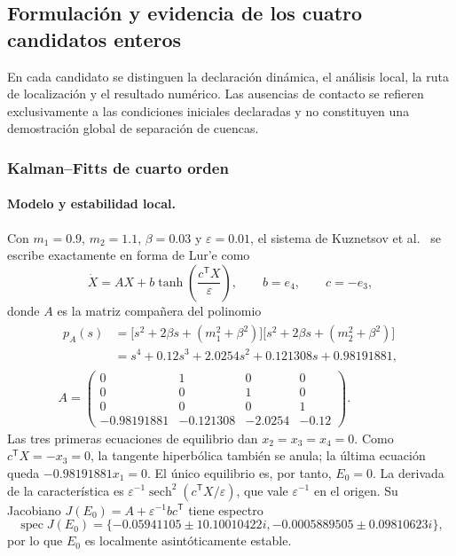 \subsection{Formulación y evidencia de los cuatro candidatos enteros}

En cada candidato se distinguen la declaración dinámica, el análisis local, la
ruta de localización y el resultado numérico. Las ausencias de contacto se
refieren exclusivamente a las condiciones iniciales declaradas y no constituyen
una demostración global de separación de cuencas.

\subsubsection{Kalman--Fitts de cuarto orden}

\paragraph{Modelo y estabilidad local.}
Con \(m_1=0.9\), \(m_2=1.1\), \(\beta=0.03\) y
\(\varepsilon=0.01\), el sistema de Kuznetsov et
al.~\cite{kalman2019} se escribe exactamente en forma de Lur'e como
\begin{equation}
 \dot X=AX+b\tanh\!\left(\frac{c^{\mathsf T}X}{\varepsilon}\right),
 \qquad b=e_4,\qquad c=-e_3,
 \label{ncbench:eq:kalman-lure}
\end{equation}
donde \(A\) es la matriz compañera del polinomio
\begin{equation}
 \begin{gathered}
  \begin{aligned}
   p_A(s)&=\bigl[s^2+2\beta s+(m_1^2+\beta^2)\bigr]
            \bigl[s^2+2\beta s+(m_2^2+\beta^2)\bigr]\\
   &=s^4+0.12s^3+2.0254s^2+0.121308s+0.98191881,
  \end{aligned}\\[0.6em]
  A=\begin{pmatrix}
   0&1&0&0\\0&0&1&0\\0&0&0&1\\
   -0.98191881&-0.121308&-2.0254&-0.12
  \end{pmatrix}.
 \end{gathered}
 \label{ncbench:eq:kalman-matrix}
\end{equation}
Las tres primeras ecuaciones de equilibrio dan \(x_2=x_3=x_4=0\).
Como \(c^{\mathsf T}X=-x_3=0\), la tangente hiperbólica también se anula;
la última ecuación queda \(-0.98191881x_1=0\). El único equilibrio es,
por tanto, \(E_0=0\). La derivada de la característica es
\(\varepsilon^{-1}\operatorname{sech}^2(c^{\mathsf T}X/\varepsilon)\),
que vale \(\varepsilon^{-1}\) en el origen. Su Jacobiano
\(J(E_0)=A+\varepsilon^{-1}bc^{\mathsf T}\) tiene espectro
\begin{equation}
 \operatorname{spec}J(E_0)=
 \{-0.05941105\pm10.10010422i,
   -0.0005889505\pm0.09810623i\},
 \label{ncbench:eq:kalman-spectrum}
\end{equation}
por lo que \(E_0\) es localmente asintóticamente estable.

